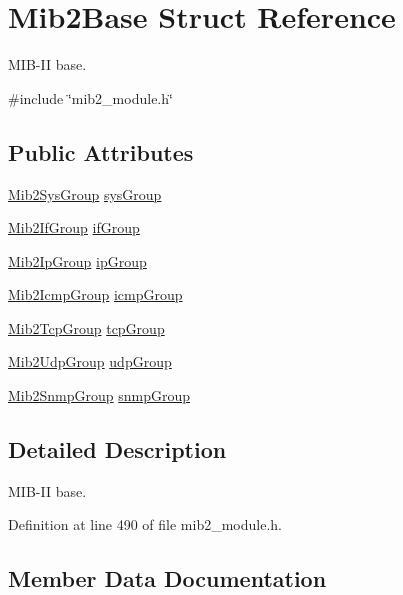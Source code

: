 \hypertarget{structMib2Base}{}\section{Mib2\+Base Struct Reference}
\label{structMib2Base}


M\+I\+B-\/\+II base.  




{\ttfamily \#include \char`\"{}mib2\+\_\+module.\+h\char`\"{}}

\subsection*{Public Attributes}
\begin{DoxyCompactItemize}
\item 
\hyperlink{structMib2SysGroup}{Mib2\+Sys\+Group} \hyperlink{structMib2Base_a5add1e15c1e18ffe496113704d5c91e3}{sys\+Group}
\item 
\hyperlink{structMib2IfGroup}{Mib2\+If\+Group} \hyperlink{structMib2Base_a92cba5dc8bb69c688aafa669a27442a4}{if\+Group}
\item 
\hyperlink{structMib2IpGroup}{Mib2\+Ip\+Group} \hyperlink{structMib2Base_a7561ab2eccf3803abaa847c4c97476a3}{ip\+Group}
\item 
\hyperlink{structMib2IcmpGroup}{Mib2\+Icmp\+Group} \hyperlink{structMib2Base_a472605588c7200994fbc1cef2fd281da}{icmp\+Group}
\item 
\hyperlink{structMib2TcpGroup}{Mib2\+Tcp\+Group} \hyperlink{structMib2Base_a55b825d40c1818285f93fc8a1db2786b}{tcp\+Group}
\item 
\hyperlink{structMib2UdpGroup}{Mib2\+Udp\+Group} \hyperlink{structMib2Base_a8a3a1848dd611e017aa9d4de20034840}{udp\+Group}
\item 
\hyperlink{structMib2SnmpGroup}{Mib2\+Snmp\+Group} \hyperlink{structMib2Base_ad154f98112579f2ac3c0beac3417e520}{snmp\+Group}
\end{DoxyCompactItemize}


\subsection{Detailed Description}
M\+I\+B-\/\+II base. 

Definition at line 490 of file mib2\+\_\+module.\+h.



\subsection{Member Data Documentation}
\mbox{\label{structMib2Base_a472605588c7200994fbc1cef2fd281da}} 

